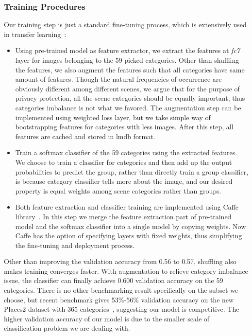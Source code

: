 \subsubsection{Training Procedures}
Our training step is just a standard fine-tuning process, which is extensively used in transfer learning~\cite{sharif2014cnn,yosinski2014transferable}:

\begin{itemize}
\item[\ding{182}] Using pre-trained model as feature extractor, we extract the features at \emph{fc7} layer for images belonging to the 59 picked categories. Other than shuffling the features, we also augment the features such that all categories have same amount of features. Though the natural frequencies of occurrence are obviously different among different scenes, we argue that for the purpose of privacy protection, all the scene categories should be equally important, thus categories imbalance is not what we favored. The augmentation step can be implemented using weighted loss layer, but we take simple way of bootstrapping features for categories with less images. After this step, all features are cached and stored in lmdb format.
\item[\ding{183}] Train a softmax classifier of the 59 categories using the extracted features. We choose to train a classifier for categories and then add up the output probabilities to predict the group, rather than directly train a group classifier, is because category classifier tells more about the image, and our desired property is equal weights among scene categories rather than groups.
\item[\ding{184}] Both feature extraction and classifier training are implemented using Caffe library~\cite{links:caffelib,jia2014caffe}. In this step we merge the feature extraction part of pre-trained model and the softmax classifier into a single model by copying weights. Now Caffe has the option of specifying layers with fixed weights, thus simplifying the fine-tuning and deployment process.
\end{itemize}

Other than improving the validation accuracy from 0.56 to 0.57, shuffling also makes training converges faster. With augmentation to relieve category imbalance issue, the classifier can finally achieve 0.600 validation accuracy on the 59 categories. There is no other benchmarking result specifically on the subset we choose, but recent benchmark gives 53\%-56\% validation accuracy on the new Places2 dataset with 365 categories~\cite{links:places2pre}, suggesting our model is competitive. The higher validation accuracy of our model is due to the smaller scale of classification problem we are dealing with.


